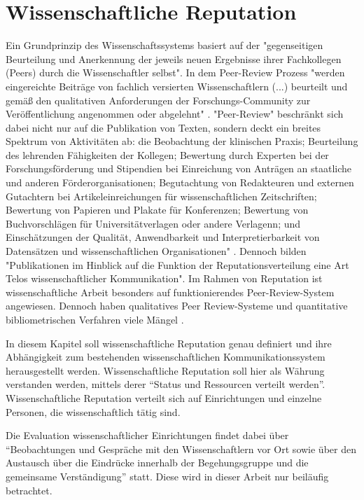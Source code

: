 \section{Wissenschaftliche Reputation}
Ein Grundprinzip des Wissenschaftssystems basiert auf der "gegenseitigen Beurteilung und Anerkennung der jeweils neuen Ergebnisse ihrer Fachkollegen (Peers) durch die Wissenschaftler selbst"\cite{Hanekop_2014}. In dem Peer-Review Prozess "werden eingereichte Beiträge von fachlich versierten Wissenschaftlern (...) beurteilt und gemäß den qualitativen Anforderungen der Forschungs-Community zur Veröffentlichung angenommen oder abgelehnt" \cite{Hess_2006}. "Peer-Review" beschränkt sich dabei nicht nur auf die Publikation von Texten, sondern deckt ein breites Spektrum von Aktivitäten ab: die Beobachtung der klinischen Praxis; Beurteilung des lehrenden Fähigkeiten der Kollegen; Bewertung durch Experten bei der Forschungsförderung und Stipendien bei Einreichung von Anträgen an staatliche und anderen Förderorganisationen; Begutachtung von Redakteuren und externen Gutachtern bei Artikeleinreichungen für wissenschaftlichen Zeitschriften; Bewertung von Papieren und Plakate für Konferenzen; Bewertung von Buchvorschlägen für Universitätverlagen oder andere Verlagenn; und Einschätzungen der Qualität, Anwendbarkeit und Interpretierbarkeit von Datensätzen und wissenschaftlichen Organisationen" \cite{Lee_2012}. Dennoch bilden "Publikationen im Hinblick auf die Funktion der Reputationsverteilung eine Art Telos wissenschaftlicher Kommunikation"\cite{hirschauer2004peer}. Im Rahmen von Reputation ist wissenschaftliche Arbeit besonders auf funktionierendes Peer-Review-System angewiesen\cite{suchen}. Dennoch haben qualitatives Peer Review-Systeme und quantitative bibliometrischen Verfahren viele Mängel\cite{osterloh2008anreize} \cite{Lee_2012}.

In diesem Kapitel soll wissenschaftliche Reputation genau definiert und ihre Abhängigkeit zum bestehenden wissenschaftlichen Kommunikationssystem herausgestellt werden. Wissenschaftliche Reputation soll hier als Währung verstanden werden, mittels derer “Status und Ressourcen verteilt werden”\cite{hanekop_2006}. Wissenschaftliche Reputation verteilt sich auf Einrichtungen und einzelne Personen, die wissenschaftlich tätig sind\cite{suchen}. 

Die Evaluation wissenschaftlicher Einrichtungen findet dabei über “Beobachtungen und Gespräche mit den Wissenschaftlern vor Ort sowie über den Austausch über die Eindrücke innerhalb der Begehungsgruppe und die gemeinsame Verständigung”\cite{Barl_sius_2008} statt. Diese wird in dieser Arbeit nur beiläufig betrachtet.

